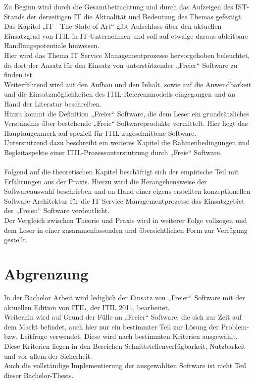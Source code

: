 Zu Beginn wird durch die Gesamtbetrachtung und durch das Aufzeigen des IST-Stands der derzeitigen IT die Aktualität und Bedeutung des Themas gefestigt.
Das Kapitel „IT - The State of Art“ gibt Aufschluss über den aktuellen Einsatzgrad von ITIL in IT-Unternehmen und soll auf etwaige daraus ableitbare Handlungspotentiale hinweisen. \\
Hier wird das Thema IT Service Managementprozesse hervorgehoben beleuchtet, da dort der Ansatz für den Einsatz von unterstützender „Freier“ Software zu finden ist.\\
Weiterführend wird auf den Aufbau und den Inhalt, sowie auf die Anwendbarkeit und die Einsatzmöglichkeiten des ITIL-Referenzmodells eingegangen und an Hand der Literatur beschreiben. 
\\
Hinzu kommt die Definition „Freier“ Software, die dem Leser ein grundsätzliches Verständnis über bestehende „Freie“ Softwareprodukte vermittelt. Hier liegt das Hauptaugenmerk auf speziell für ITIL zugeschnittene Software.\\
Unterstützend dazu beschreibt ein weiteres Kapitel die Rahmenbedingungen und Begleitaspekte einer ITIL-Prozessunterstützung durch „Freie“ Software.
\\
\\
Folgend auf die theoretischen Kapitel beschäftigt sich der empirische Teil mit Erfahrungen aus der Praxis.
Hierzu wird die Herangehensweise der Softwareauswahl beschrieben und an Hand einer eigens erstellten konzeptionellen Software-Architektur für die IT Service Managementprozesse das Einsatzgebiet der „Freien“ Software verdeutlicht.\\   
Der Vergleich zwischen Theorie und Praxis wird in weiterer Folge vollzogen und dem Leser in einer zusammenfassenden und übersichtlichen Form zur Verfügung gestellt.

\section{Abgrenzung}
\label{ch:ITStateOfArt:sec:Abgrenzung}

In der Bachelor Arbeit wird lediglich der Einsatz von „Freier“ Software mit der aktuellen Edition von ITIL, der ITIL 2011, bearbeitet. 
\\
Weiterhin wird auf Grund der Fülle an „Freier“ Software, die sich zur Zeit auf dem Markt befindet, auch hier nur ein bestimmter Teil zur Lösung der Problem- bzw. Leitfrage verwendet. Diese wird nach bestimmten Kriterien ausgewählt. Diese Kriterien liegen in den Bereichen Schnittstellenverfügbarkeit, Nutzbarkeit und vor allem der Sicherheit.\\
Auch die vollständige Implementierung der ausgewählten Software ist nicht Teil dieser Bachelor-Thesis. 

